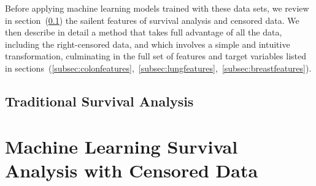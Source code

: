\documentclass[a4paper,11pt]{article}
\newcommand{\codewhite}[1]{\colorbox{white}{\texttt{#1}}}
\begin{document}



Before applying machine learning models trained with these data sets, we review in section~(\ref{subsec:survprimer}) the sailent features of survival analysis and censored data. We then describe in detail a method that takes full advantage of all the data, including the right-censored data, and which involves a simple and intuitive transformation, culminating in the full set of features and target variables listed in sections~(\ref{subsec:colonfeatures},~\ref{subsec:lungfeatures},~\ref{subsec:breastfeatures}).


\subsection{Traditional Survival Analysis}

\label{subsec:survprimer}

\section{Machine Learning Survival Analysis with Censored Data}
\label{sec:surv}




\end{document}
